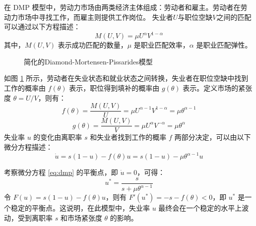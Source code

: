 \documentclass{article}
\begin{document}
在 DMP 模型中，劳动力市场由两类经济主体组成：劳动者和雇主。劳动者在劳动力市场中寻找工作，而雇主则提供工作岗位。
失业者$U$与职位空缺$V$之间的匹配可以通过以下方程描述：
\begin{equation}
    M(U, V) = \mu U^\alpha V^{1-\alpha}
\end{equation}
其中，$M(U, V)$ 表示成功匹配的数量，$\mu$ 是职业匹配效率，$\alpha$ 是职业匹配弹性。
\begin{figure}[htbp]
    \centering
    \caption{简化的Diamond-Mortensen-Pissarides模型}
    \label{fig:dmp}
\end{figure}
如图 \ref{fig:dmp} 所示，劳动者在失业状态和就业状态之间转换，失业者在职位空缺中找到工作的概率由 $f(\theta)$ 表示，职位得到填补的概率由 $g(\theta)$ 表示。定义市场的紧张度 $\theta = U / V$，则有：
\begin{equation}
    f(\theta) = \frac{M(U, V)}{U} = \mu U^{\alpha-1} V^{1-\alpha} = \mu \theta^{\alpha-1}
\end{equation}
\begin{equation}
    g(\theta) = \frac{M(U, V)}{V} = \mu U^\alpha V^{-\alpha} = \mu \theta^{\alpha}
\end{equation}
失业率 $u$ 的变化由离职率 $s$ 和失业者找到工作的概率 $f$ 两部分决定，可以由以下微分方程描述：
\begin{equation}
    \dot{u} = s(1 - u) - f(\theta) u = s(1 - u) - \mu \theta^{\alpha-1} u
    \label{eq:dmp}
\end{equation}

考察微分方程 \eqref{eq:dmp} 的平衡点，即 $\dot{u} = 0$，可得：
\begin{equation}
    u^* = \frac{s}{s + \mu \theta^{\alpha-1}}
\end{equation}
令 $F(u) = s(1 - u) - f(\theta) u$，则有 $F'(u^*) = -s - f(\theta) < 0$，即 $u^*$ 是一个稳定的平衡点。这说明，在此模型中，失业率 $u$ 最终会在一个稳定的水平上波动，受到离职率 $s$ 和市场紧张度 $\theta$ 的影响。
\end{document}

